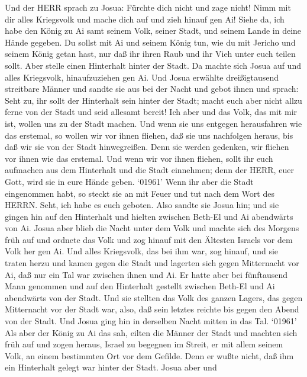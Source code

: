  Und der HERR sprach zu Josua: Fürchte dich nicht und zage
nicht! Nimm mit dir alles Kriegsvolk und mache dich auf und zieh hinauf
gen Ai! Siehe da, ich habe den König zu Ai samt seinem Volk, seiner
Stadt, und seinem Lande in deine Hände gegeben.  Du sollst
mit Ai und seinem König tun, wie du mit Jericho und seinem König getan
hast, nur daß ihr ihren Raub und ihr Vieh unter euch teilen sollt. Aber
stelle einen Hinterhalt hinter der Stadt.  Da machte sich
Josua auf und alles Kriegsvolk, hinaufzuziehen gen Ai. Und Josua
erwählte dreißigtausend streitbare Männer und sandte sie aus bei der
Nacht  und gebot ihnen und sprach: Seht zu, ihr sollt der
Hinterhalt sein hinter der Stadt; macht euch aber nicht allzu ferne von
der Stadt und seid allesamt bereit!  Ich aber und das Volk,
das mit mir ist, wollen uns zu der Stadt machen. Und wenn sie uns
entgegen herausfahren wie das erstemal, so wollen wir vor ihnen fliehen,
 daß sie uns nachfolgen heraus, bis daß wir sie von der
Stadt hinwegreißen. Denn sie werden gedenken, wir fliehen vor ihnen wie
das erstemal. Und wenn wir vor ihnen fliehen,  sollt ihr
euch aufmachen aus dem Hinterhalt und die Stadt einnehmen; denn der
HERR, euer Gott, wird sie in eure Hände geben.  `01961' Wenn
ihr aber die Stadt eingenommen habt, so steckt sie an mit Feuer und tut
nach dem Wort des HERRN. Seht, ich habe es euch geboten. 
Also sandte sie Josua hin; und sie gingen hin auf den Hinterhalt und
hielten zwischen Beth-El und Ai abendwärts von Ai. Josua aber blieb die
Nacht unter dem Volk  und machte sich des Morgens früh auf
und ordnete das Volk und zog hinauf mit den Ältesten Israels vor dem
Volk her gen Ai.  Und alles Kriegsvolk, das bei ihm war,
zog hinauf, und sie traten herzu und kamen gegen die Stadt und lagerten
sich gegen Mitternacht vor Ai, daß nur ein Tal war zwischen ihnen und
Ai.  Er hatte aber bei fünftausend Mann genommen und auf
den Hinterhalt gestellt zwischen Beth-El und Ai abendwärts von der
Stadt.  Und sie stellten das Volk des ganzen Lagers, das
gegen Mitternacht vor der Stadt war, also, daß sein letztes reichte bis
gegen den Abend von der Stadt. Und Josua ging hin in derselben Nacht
mitten in das Tal.  `01961' Als aber der König zu Ai das
sah, eilten die Männer der Stadt und machten sich früh auf und zogen
heraus, Israel zu begegnen im Streit, er mit allem seinem Volk, an einem
bestimmten Ort vor dem Gefilde. Denn er wußte nicht, daß ihm ein
Hinterhalt gelegt war hinter der Stadt.  Josua aber und
